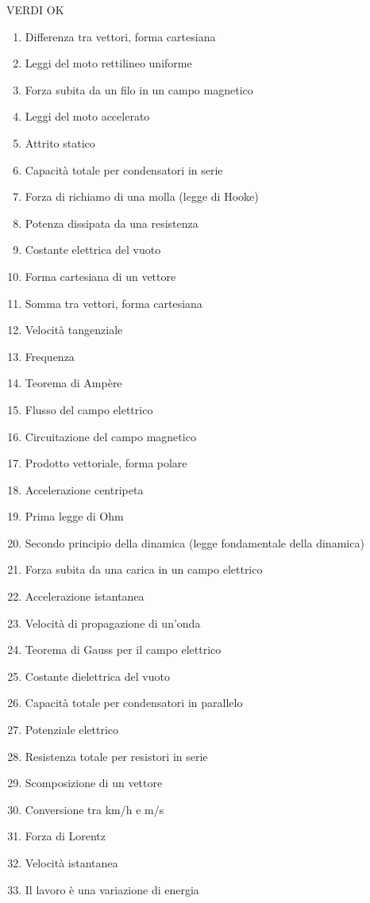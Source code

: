 \documentclass[a4paper,11pt,italian]{article}
\begin{document}
VERDI OK
\begin{enumerate}
\item Differenza tra vettori, forma cartesiana
\item Leggi del moto rettilineo uniforme
\item Forza subita da un filo in un campo magnetico
\item Leggi del moto accelerato
\item Attrito statico
\item Capacità totale per condensatori in serie
\item Forza di richiamo di una molla (legge di Hooke)
\item Potenza dissipata da una resistenza
\item Costante elettrica del vuoto 
\item Forma cartesiana di un vettore
\item Somma tra vettori, forma cartesiana
\item Velocità tangenziale
\item Frequenza 
\item Teorema di Ampère
\item Flusso del campo elettrico
\item Circuitazione del campo magnetico
\item Prodotto vettoriale, forma polare
\item Accelerazione centripeta
\item Prima legge di Ohm
\item Secondo principio della dinamica (legge fondamentale della dinamica)
\item Forza subita da una carica in un campo elettrico
\item Accelerazione istantanea
\item Velocità di propagazione di un'onda
\item Teorema di Gauss per il campo elettrico
\item Costante dielettrica del vuoto
\item Capacità totale per condensatori in parallelo
\item Potenziale elettrico
\item Resistenza totale per resistori in serie
\item Scomposizione di un vettore
\item Conversione tra km/h e m/s
\item Forza di Lorentz
\item Velocità istantanea
\item Il lavoro è una variazione di energia

\end{enumerate}
\end{document}
